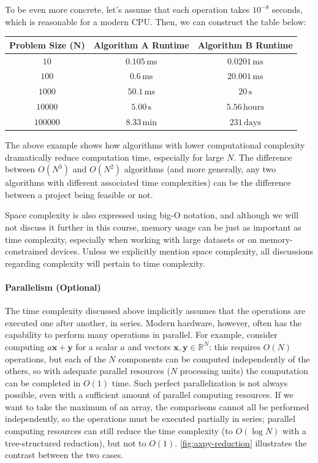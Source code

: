 \begin{exampleBox}
    To be even more concrete, let's assume that each operation takes $10^{-8}$ seconds, which is reasonable for a modern CPU. Then, we can construct the table below:
    \begin{center}
        \begin{tabular}{c|c|c}
            \textbf{Problem Size ($\boldsymbol{N}$)} & \textbf{Algorithm A Runtime} & \textbf{Algorithm B Runtime} \\
            \hline
            $10$ & $0.105 \,\text{ms}$ & $0.0201 \,\text{ms}$ \\
            $100$ & $0.6 \,\text{ms}$ & $20.001 \,\text{ms}$ \\
            $1000$ & $50.1 \,\text{ms}$ & $20 \,\text{s}$ \\
            $10000$ & $5.00 \,\text{s}$ & $5.56 \,\text{hours}$ \\
            $100000$ & $8.33 \,\text{min}$ & $231 \,\text{days}$ \\
        \end{tabular}
    \end{center}
\end{exampleBox}

The above example shows how algorithms with lower computational complexity dramatically reduce computation time, especially for large $N$. The difference between $O(N^3)$ and $O(N^2)$ algorithms (and more generally, any two algorithms with different associated time complexities) can be the difference between a project being feasible or not.

Space complexity is also expressed using big-O notation, and although we will not discuss it further in this course, memory usage can be just as important as time complexity, especially when working with large datasets or on memory-constrained devices.
Unless we explicitly mention space complexity, all discussions regarding complexity will pertain to time complexity.

\paragraph*{Parallelism (Optional)}
The time complexity discussed above implicitly assumes that the operations are executed one after another, in series.
Modern hardware, however, often has the capability to perform many operations in parallel.
For example, consider computing $a\mathbf{x} + \mathbf{y}$ for a scalar $a$ and vectors $\mathbf{x}, \mathbf{y} \in \mathbb{R}^N$: this requires $O(N)$ operations, but each of the $N$ components can be computed independently of the others, so with adequate parallel resources ($N$ processing units) the computation can be completed in $O(1)$ time.
Such perfect parallelization is not always possible, even with a sufficient amount of parallel computing resources.
If we want to take the maximum of an array, the comparisons cannot all be performed independently, so the operations must be executed partially in series; parallel computing resources can still reduce the time complexity (to $O(\log N)$ with a tree-structured reduction), but not to $O(1)$.
\autoref{fig:axpy-reduction} illustrates the contrast between the two cases.

